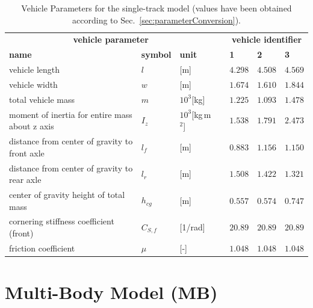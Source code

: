\documentclass[11pt,a4paper]{article}
\renewcommand{\^}[1]{^{(#1)}}
\renewcommand{\a}{l_f} %
\renewcommand{\b}{l_r} %
\begin{document}
\begin{table}[h]
\caption{Vehicle Parameters for the single-track model (values have been obtained according to Sec.~\ref{sec:parameterConversion}).}
{\small
\begin{center}\label{tab:vehicleParametersST}
\begin{tabular}{lllclll}
	\toprule
	\multicolumn{3}{c}{\textbf{vehicle parameter}} & \phantom{a} & \multicolumn{3}{c}{\textbf{vehicle identifier}} \\ \cmidrule{1-3} \cmidrule{5-7} 
	\textbf{name} & \textbf{symbol} & \textbf{unit} && \textbf{1} & \textbf{2} & \textbf{3}  \\ \hline
	vehicle length & $l$ & [m] && $4.298$ & $4.508$ & $4.569$ \\
	vehicle width & $w$ & [m] && $1.674$ & $1.610$ & $1.844$ \\
	total vehicle mass & $m$ & $10^3$[kg] && $1.225$ & $1.093$ & $1.478$ \\ 
	moment of inertia for entire mass about z axis & $I_z$ & $10^3$[kg\,m$^2$] && $1.538$ & $1.791$ & $2.473$ \\ 
	distance from center of gravity to front axle & $\a$ & [m] && $0.883$ & $1.156$ & $1.150$ \\
	distance from center of gravity to rear axle & $\b$ & [m] && $1.508$ & $1.422$ & $1.321$ \\ 
	center of gravity height of total mass & $h_{cg}$ & [m] && $0.557$ & $0.574$ & $0.747$ \\ 
	cornering stiffness coefficient (front) & $C_{S,f}$ & [1/rad] && $20.89$ & $20.89$ & $20.89$ \\
        friction coefficient & $\mu$ & [-] && $1.048$ & $1.048$ & $1.048$ \\
	\bottomrule 
\end{tabular}
\end{center}}
\end{table}




\section{Multi-Body Model (MB)} \label{sec:MBmodel} 
\end{document}
